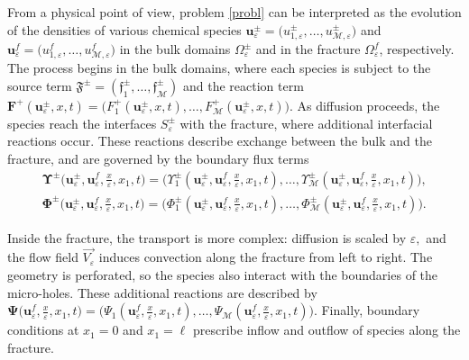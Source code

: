 \documentclass[reqno]{amsart}            %
\numberwithin{equation}{section}
\begin{document}
	
	From a physical point of view, problem \eqref{probl} can be interpreted as the evolution of the densities of various chemical species
	$\mathbf{u}^\pm_\varepsilon = \big(u^\pm_{1,\varepsilon},\ldots,u^\pm_{\mathcal{M},\varepsilon}\big)$ and
	$\mathbf{u}^f_\varepsilon = \big(u^f_{1,\varepsilon},\ldots,u^f_{\mathcal{M},\varepsilon}\big)$
	in the bulk domains $\Omega_\varepsilon^\pm$ and in the fracture $\Omega_\varepsilon^f$, respectively.
	The process begins in the bulk domains, where each species is subject to the source term
	 $\boldsymbol{\mathfrak{F}}^\pm= (\mathfrak{f}_1^\pm,\ldots,\mathfrak{f}_\mathcal{M}^\pm)$ and the reaction term $\mathbf{F}^+(\mathbf{u}^\pm_\varepsilon,x,t)=\big(F^+_1(\mathbf{u}^\pm_\varepsilon,x,t),\ldots,F^+_\mathcal{M}(\mathbf{u}^\pm_\varepsilon,x,t)\big)$. 
	As diffusion proceeds, the species reach the interfaces $S_\varepsilon^\pm$ with the fracture, where 
	additional interfacial reactions occur. These reactions describe exchange between the bulk and the fracture, and are 
	governed by the boundary flux terms  
	\begin{gather*}
		\mathbf{\Upsilon}^\pm\big(\mathbf{u}^\pm_\varepsilon,\mathbf{u}^f_\varepsilon, \tfrac{x}{\varepsilon}, x_1, t\big) =
		\big(\Upsilon^\pm_1(\mathbf{u}^\pm_\varepsilon, \mathbf{u}^f_\varepsilon, \tfrac{x}{\varepsilon}, x_1, t),\ldots,\Upsilon^\pm_\mathcal{M}(\mathbf{u}^\pm_\varepsilon, \mathbf{u}^f_\varepsilon, \tfrac{x}{\varepsilon}, x_1, t)\big),    
		\\
		\mathbf{\Phi}^\pm\big(\mathbf{u}^\pm_\varepsilon,\mathbf{u}^f_\varepsilon, \tfrac{x}{\varepsilon}, x_1, t\big) =
		\big(\Phi^\pm_1(\mathbf{u}^\pm_\varepsilon, \mathbf{u}^f_\varepsilon, \tfrac{x}{\varepsilon}, x_1, t),\ldots,\Phi^\pm_\mathcal{M}(\mathbf{u}^\pm_\varepsilon, \mathbf{u}^f_\varepsilon, \tfrac{x}{\varepsilon}, x_1, t)\big).    
	\end{gather*}
	
	Inside the fracture, the transport is more complex: diffusion is scaled by $\varepsilon,$ and the flow field $\overrightarrow{V_\varepsilon}$ induces convection along the fracture from left to right. The 
	geometry is perforated, so the species also interact with the boundaries of the micro-holes. These additional 
	reactions are described by $\mathbf{\Psi}\big(\mathbf{u}^f_\varepsilon, \tfrac{x}{\varepsilon}, x_1, t\big) =
	\big(\Psi_1(\mathbf{u}^f_\varepsilon, \tfrac{x}{\varepsilon}, x_1, t),\ldots,\Psi_\mathcal{M}(\mathbf{u}^f_\varepsilon, \tfrac{x}{\varepsilon}, x_1, t)\big).$  Finally, boundary conditions at $x_1=0$ and $x_1=\ell$ prescribe inflow and outflow of species along the fracture.
	
\end{document}
